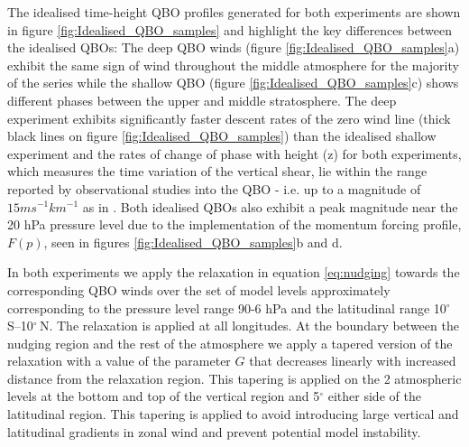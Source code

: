 The idealised time-height QBO profiles generated for both experiments are shown in figure \ref{fig:Idealised_QBO_samples} and highlight the key differences between the idealised QBOs: The deep QBO winds (figure \ref{fig:Idealised_QBO_samples}a) exhibit the same sign of wind throughout the middle atmosphere for the majority of the series while the shallow QBO (figure \ref{fig:Idealised_QBO_samples}c) shows different phases between the upper and middle stratosphere. The deep experiment exhibits significantly faster descent rates of the zero wind line (thick black lines on figure \ref{fig:Idealised_QBO_samples}) than the idealised shallow experiment and the rates of change of phase with height (z) for both experiments, which measures the time variation of the vertical shear, lie within the range reported by observational studies into the QBO - i.e. up to a magnitude of $15ms^{-1}km^{-1}$ as in \cite{kinnersleyDescent1996}. Both idealised QBOs also exhibit a peak magnitude near the 20 hPa pressure level due to the implementation of the momentum forcing profile, $F(p)$, seen in figures \ref{fig:Idealised_QBO_samples}b and d. 

In both experiments we apply the relaxation in equation \ref{eq:nudging} towards the corresponding QBO winds over the set of model levels approximately corresponding to the pressure level range 90-6 hPa and the latitudinal range 10$^{\circ}$\,S--10$^{\circ}$\,N. The relaxation is applied at all longitudes. At the boundary between the nudging region and the rest of the atmosphere we apply a tapered version of the relaxation with a value of the parameter $G$ that decreases linearly with increased distance from the relaxation region. This tapering is applied on the 2 atmospheric levels at the bottom and top of the vertical region and 5$^\circ$ either side of the latitudinal region. This tapering is applied to avoid introducing large vertical and latitudinal gradients in zonal wind and prevent potential model instability. 

